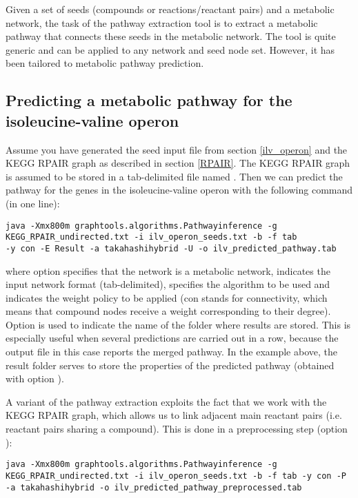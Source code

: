 Given a set of seeds (compounds or reactions/reactant pairs) and a metabolic
network, the task of the pathway extraction tool is to extract a metabolic
pathway that connects these seeds in the metabolic network. The tool is quite generic and can be
applied to any network and seed node set. However, it has been tailored to
metabolic pathway prediction.

\subsection{Predicting a metabolic pathway for the isoleucine-valine operon}

Assume you have generated the seed input file from section \ref{ilv_operon} and
the KEGG RPAIR graph as described in section \ref{RPAIR}. The KEGG RPAIR graph
is assumed to be stored in a tab-delimited file named
. Then we can predict the pathway for the
genes in the isoleucine-valine operon with the following command (in one line):

\begin{verbatim}
java -Xmx800m graphtools.algorithms.Pathwayinference -g
KEGG_RPAIR_undirected.txt -i ilv_operon_seeds.txt -b -f tab  
-y con -E Result -a takahashihybrid -U -o ilv_predicted_pathway.tab
\end{verbatim}

where option  specifies that the network is a metabolic
network,  indicates the input network format (tab-delimited),
 specifies the algorithm to be used and  indicates the
weight policy to be applied (con stands for connectivity, which means that
compound nodes receive a weight corresponding to their degree). 
Option  is used to indicate the name of the folder where results are
stored. This is especially useful when several predictions are carried out in a
row, because the output file in this case reports the merged pathway. In the
example above, the result folder serves to store the properties of
the predicted pathway (obtained with option ).

A variant of the pathway extraction exploits the fact that we work with the
KEGG RPAIR graph, which allows us to link adjacent main reactant pairs (i.e.
reactant pairs sharing a compound). This is done in a preprocessing step
(option ):

\begin{verbatim}
java -Xmx800m graphtools.algorithms.Pathwayinference -g
KEGG_RPAIR_undirected.txt -i ilv_operon_seeds.txt -b -f tab -y con -P 
-a takahashihybrid -o ilv_predicted_pathway_preprocessed.tab
\end{verbatim}

